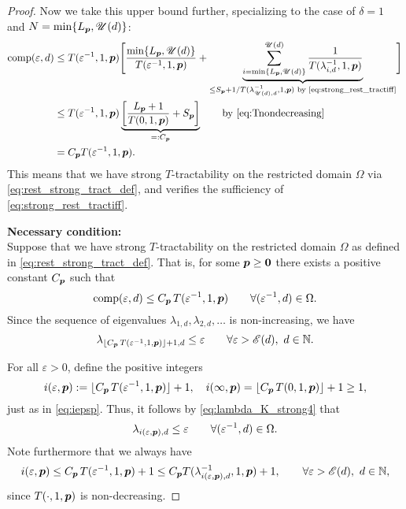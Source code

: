 \documentclass[sort&compress]{elsarticle}
\newcommand{\thed}{\delta}
\newcommand{\theM}{\mathscr{E}}
\newcommand{\theUB}{\mathscr{U}}
\begin{document}
\begin{proof}
Now we take this upper bound further, specializing to the case of $\thed=1$ and $N = \min\{L_{\vp},\theUB(d)\}$:
\begin{align*}
       \comp(\varepsilon,d)
       & \le T(\varepsilon^{-1},1, \vp) \Biggl [ \frac{\min\{L_{\vp},\theUB(d)\}}{T(\varepsilon^{-1},1, \vp)}  + \underbrace{\sum_{i = \min\{L_{\vp},\theUB(d)\}}^{\theUB(d)} \frac{1}{T(\lambda_{i, d}^{-1},1,\vp)}}_{\le S_{\vp} + 1/ T(\lambda_{\theUB(d), d}^{-1},1,\vp) \text{ by \eqref{eq:strong_rest_tractiff}} }
        \Biggr] \\
       & \le T(\varepsilon^{-1},1,\vp) \underbrace{\left[\frac{L_{\vp}+1}{T(0,1, \vp)} + S_{\vp} \right]}_{=:C_{\vp}}
       \qquad \text{by \eqref{eq:Tnondecreasing}}\\
       & =  C_{\vp}T(\varepsilon^{-1},1,\vp).
\end{align*}
This means that we have strong $T$-tractability on the restricted domain $\Omega$ via \eqref{eq:rest_strong_tract_def}, and verifies the sufficiency of \eqref{eq:strong_rest_tractiff}.



\bigskip
\noindent \textbf{Necessary condition:} \\
Suppose that we have strong
$T$-tractability on the restricted domain $\Omega$ as defined in \eqref{eq:rest_strong_tract_def}. That is, for some $\boldsymbol{p} \ge \boldsymbol{0}$ there exists a positive constant $C_{\boldsymbol{p}}$ such that
\[
\operatorname{comp}(\varepsilon,d)\le C_{\boldsymbol{p}}\, T(\varepsilon^{-1},1,\boldsymbol{p})
\qquad \forall (\varepsilon^{-1}, d) \in \Omega.
\]
Since the sequence of eigenvalues $\lambda_{1,d}, \lambda_{2,d}, \ldots $ is non-increasing, we have
\begin{equation}\label{eq:lambda_K_strong4}
\lambda_{\lfloor C_{\vp}\, T(\varepsilon^{-1},1,\vp)\rfloor +1,d}\le \varepsilon \qquad \forall \varepsilon > \theM(d), \ d \in \mathbb{N}.
\end{equation}

For  all $\varepsilon > 0$, define the positive integers
\[
i(\varepsilon,\boldsymbol{p}):= \lfloor C_{\boldsymbol{p}}\, T(\varepsilon^{-1},1,\boldsymbol{p})\rfloor +1, \quad
i(\infty,\boldsymbol{p}) =  \lfloor C_{\boldsymbol{p}}\, T(0,1,\boldsymbol{p})\rfloor +1 \ge 1,
\]
just as in \eqref{eq:iepsp}.
Thus, it follows by \eqref{eq:lambda_K_strong4} that
\begin{equation} \label{eq:lambdaiep}
\lambda_{i(\varepsilon,\boldsymbol{p}),d} \le \varepsilon \qquad
 \forall (\varepsilon^{-1}, d) \in \Omega.
\end{equation}
Note furthermore that we always have
\[
i(\varepsilon,\vp)\le C_{\vp}\, T(\varepsilon^{-1},1,\vp)+1 \le C_{\vp} T(\lambda_{i(\varepsilon,\vp),d}^{-1},1,\vp)+1, \qquad  \forall \varepsilon > \theM(d), \ d \in \mathbb{N},
\]
since
$T(\cdot,1, \boldsymbol{p})$ is non-decreasing.


\end{proof}
\end{document}
